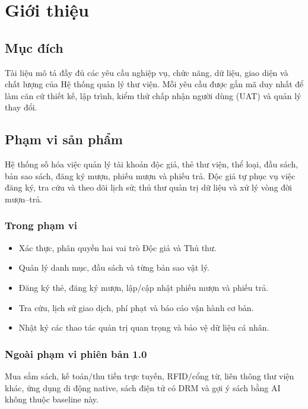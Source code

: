 \documentclass[12pt,a4paper,oneside]{report}
\begin{document}
\chapter{Giới thiệu}
\section{Mục đích}
Tài liệu mô tả đầy đủ các yêu cầu nghiệp vụ, chức năng, dữ liệu, giao diện và chất lượng của Hệ thống quản lý thư viện. Mỗi yêu cầu được gắn mã duy nhất để làm căn cứ thiết kế, lập trình, kiểm thử chấp nhận người dùng (UAT) và quản lý thay đổi.

\section{Phạm vi sản phẩm}
Hệ thống số hóa việc quản lý tài khoản độc giả, thẻ thư viện, thể loại, đầu sách, bản sao sách, đăng ký mượn, phiếu mượn và phiếu trả. Độc giả tự phục vụ việc đăng ký, tra cứu và theo dõi lịch sử; thủ thư quản trị dữ liệu và xử lý vòng đời mượn--trả.

\subsection{Trong phạm vi}
\begin{itemize}
\item Xác thực, phân quyền hai vai trò Độc giả và Thủ thư.
\item Quản lý danh mục, đầu sách và từng bản sao vật lý.
\item Đăng ký thẻ, đăng ký mượn, lập/cập nhật phiếu mượn và phiếu trả.
\item Tra cứu, lịch sử giao dịch, phí phạt và báo cáo vận hành cơ bản.
\item Nhật ký các thao tác quản trị quan trọng và bảo vệ dữ liệu cá nhân.
\end{itemize}
\subsection{Ngoài phạm vi phiên bản 1.0}
Mua sắm sách, kế toán/thu tiền trực tuyến, RFID/cổng từ, liên thông thư viện khác, ứng dụng di động native, sách điện tử có DRM và gợi ý sách bằng AI không thuộc baseline này.
\end{document}
